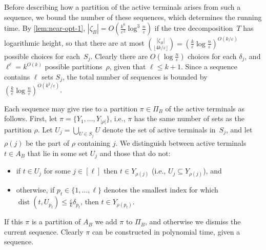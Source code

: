 \documentclass[a4paper]{article}
\theoremstyle{plain}
\newcommand{\eps}{{\varepsilon}}
\DeclareMathOperator{\dist}{dist}
\begin{document}
Before describing how a partition of the active terminals arises from such a sequence, 
we bound the number of these sequences, which determines the running time.
By \autoref{lem:near-opt-1}, $|\zeta_B|=O(\frac{k^6}{\eps^2}\log^3\frac{n}{\eps})$ if the tree decomposition~$T$ has logarithmic height, so that there are
at most $\binom{|\zeta_B|}{\lfloor 4k/\eps\rfloor}=(\frac{k}{\eps}\log\frac{n}{\eps})^{O(k/\eps)}$ possible choices for each~$S_j$. Clearly there are $O(\log\frac{n}{\eps})$ choices for each $\delta_j$, and $\ell^\ell=k^{O(k)}$ possible partitions~$\rho$,
given that $\ell\leq k+1$. Since a sequence contains $\ell$ sets $S_j$, the total number of sequences is bounded by~$(\frac{k}{\eps}\log\frac{n}{\eps})^{O(k^2/\eps)}$.

Each sequence may give rise to a partition $\pi\in\Pi_B$ of the active terminals as follows.
First, let $\pi=\{Y_1,\ldots,Y_{|\rho|}\}$, i.e., $\pi$ has the same number of sets as the partition $\rho$.
Let $U_j=\bigcup_{U\in S_j} U$ denote the set of active terminals in~$S_j$, 
and let $\rho(j)$ be the part of $\rho$ containing $j$.
We distinguish between active terminals $t\in A_B$ that lie in some set $U_j$ and those that do not:
\begin{itemize}
    \item if $t\in U_j$ for some $j\in[\ell]$ then $t\in Y_{\rho(j)}$ (i.e., $U_j\subseteq Y_{\rho(j)}$), and
    \item otherwise, if $p_t\in\{1,\ldots,\ell\}$ denotes the smallest index for which $\dist(t,U_{p_t})\leq\frac{\eps}{k}\delta_{p_t}$, then $t\in Y_{\rho(p_t)}$.
\end{itemize}
If this $\pi$ is a partition of $A_B$ we add $\pi$ to $\Pi_B$, and otherwise we dismiss the current sequence.
Clearly $\pi$ can be constructed in polynomial time, given a sequence.
\end{document}
